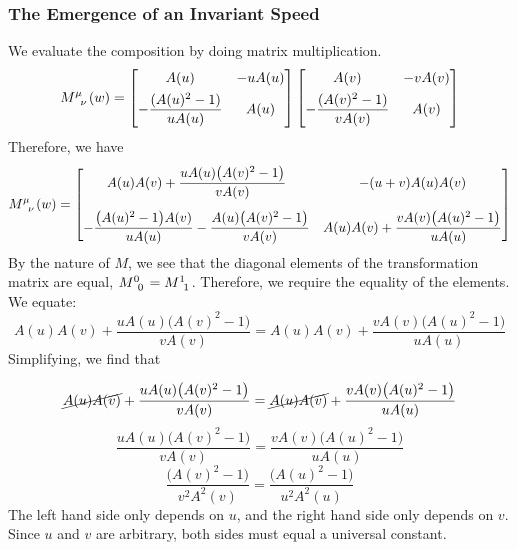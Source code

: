 	\subsubsection{The Emergence of an Invariant Speed}
		\label{subsubsec:emergenceinvariantspeed}
		We evaluate the composition by doing matrix multiplication.
		\begin{equation*}
			\tensor{M}{^\mu_\nu}(w) = 
			\bmqty{
				A(u) & -uA(u) \\[4pt]
				- \dfrac{(A(u)^2-1)}{uA(u)} 
					 & A(u)
			}
			\bmqty{
				A(v) & -vA(v) \\[4pt]
				- \dfrac{(A(v)^2-1)}{vA(v)} 
					 & A(v)
			}
		\end{equation*}
		Therefore, we have
		{\scriptsize
			\begin{equation*}
			\tensor{M}{^\mu_\nu}(w) = 
			\begin{bmatrix}
				A(u)A(v) + \dfrac{uA(u)\bigl(A(v)^2-1\bigr)}{vA(v)} & 
				-(u+v)A(u)A(v) \\[14pt]
				-\dfrac{\bigl(A(u)^2-1\bigr)A(v)}{uA(u)} - \dfrac{A(u)\bigl(A(v)^2-1\bigr)}{vA(v)} & 
				A(u)A(v) + \dfrac{vA(v)\bigl(A(u)^2-1\bigr)}{uA(u)}
			\end{bmatrix}
			\end{equation*}
		}
		By the nature of $M$, we see that the diagonal elements of the transformation matrix
		are equal, $\tensor{M}{^0_0}=\tensor{M}{^1_1}$. Therefore, we require the 
		equality of the elements. We equate:
		\begin{equation}
			A(u)A(v) + \dfrac{uA(u)\bigl(A(v)^2-1\bigr)}{vA(v)} 
			=
			A(u)A(v) + \dfrac{vA(v)\bigl(A(u)^2-1\bigr)}{uA(u)}
		\end{equation}
		Simplifying, we find that

		\begin{equation*}
			\cancel{A(u)A(v)} + \dfrac{uA(u)\bigl(A(v)^2-1\bigr)}{vA(v)} 
			=
			\cancel{A(u)A(v)} + \dfrac{vA(v)\bigl(A(u)^2-1\bigr)}{uA(u)}
		\end{equation*}
		\begin{equation}
			\dfrac{uA(u)\bigl(A(v)^2-1\bigr)}{vA(v)} 
			=
			\dfrac{vA(v)\bigl(A(u)^2-1\bigr)}{uA(u)}
		\end{equation}
		\begin{equation}
			\dfrac{\bigl(A(v)^2-1\bigr)}{v^2A^2(v)} 
			=
			\dfrac{\bigl(A(u)^2-1\bigr)}{u^2A^2(u)}
		\end{equation}
		The left hand side only depends on $u$, and the right hand side only depends on $v$.
		Since $u$ and $v$ are arbitrary, both sides must equal a universal constant.

